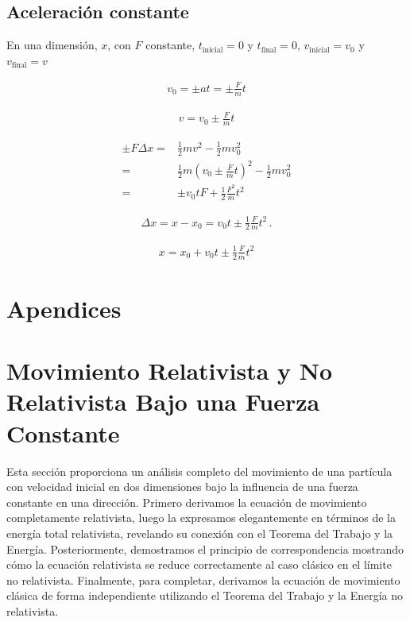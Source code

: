 \documentclass[11pt,a4paper]{article}
\begin{document}
\subsection{Aceleración constante}


En una dimensión, $x$, con $F$ constante, $t_{\text{inicial}} = 0$ y $t_{\text{final}} = 0$, $v_{\text{inicial}} = v_0$ y $v_{\text{final}} = v$

\begin{align}
    v_0 = \pm a t =\pm \frac{F}{m} t
\end{align}

\begin{align}
    v = v_0 \pm\frac{F}{m} t
\end{align}

\begin{align*}
    \pm F\Delta x =& \frac{1}{2}mv^2 - \frac{1}{2}mv^2_0\\
    =&\frac{1}{2}m \left(v_0 \pm\frac{F}{m} t\right)^2 - 
    \frac{1}{2}mv^2_0\\
    =& \pm v_0 t F +\frac{1}{2}\frac{F^2}{m} t^2
\end{align*}

\begin{align*}
    \Delta x = x-x_0 = v_0 t \pm \frac{1}{2}\frac{F}{m} t^2\,.
\end{align*}

\begin{align}
    x = x_0 + v_0 t \pm \frac{1}{2}\frac{F}{m} t^2
\end{align}
\appendix

\section*{Apendices}


\section{Movimiento Relativista y No Relativista Bajo una Fuerza Constante}
Esta sección proporciona un análisis completo del movimiento de una partícula con velocidad inicial en dos dimensiones bajo la influencia de una fuerza constante en una dirección. Primero derivamos la ecuación de movimiento completamente relativista, luego la expresamos elegantemente en términos de la energía total relativista, revelando su conexión con el Teorema del Trabajo y la Energía. Posteriormente, demostramos el principio de correspondencia mostrando cómo la ecuación relativista se reduce correctamente al caso clásico en el límite no relativista. Finalmente, para completar, derivamos la ecuación de movimiento clásica de forma independiente utilizando el Teorema del Trabajo y la Energía no relativista.
\end{document}
